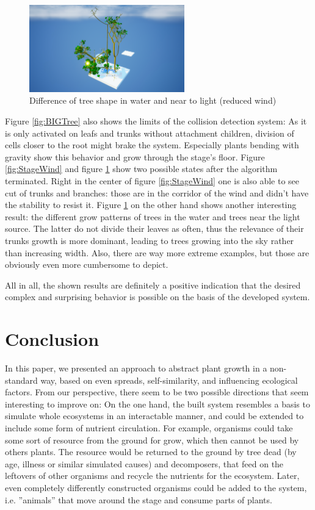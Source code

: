 \documentclass[11pt]{scrartcl}
\begin{document}
\begin{figure}
 	 \centering
 	    \includegraphics[width=0.6\textwidth]{SS_StageTallTrees.png}
 	 \caption{Difference of tree shape in water and near to light (reduced wind)}
 	 \label{fig:StageTallTrees}
\end{figure}

Figure \ref{fig:BIGTree} also shows the limits of the collision detection system: As it is only activated on leafs and trunks without attachment children, division of cells closer to the root might brake the system. Especially plants bending with gravity show this behavior and grow through the stage's floor. Figure \ref{fig:StageWind} and figure \ref{fig:StageTallTrees} show two possible states after the algorithm terminated. Right in the center of figure \ref{fig:StageWind} one is also able to see cut of trunks and branches: those are in the corridor of the wind and didn't have the stability to resist it. Figure \ref{fig:StageTallTrees} on the other hand shows another interesting result: the different grow patterns of trees in the water and trees near the light source. The latter do not divide their leaves as often, thus the relevance of their trunks growth is more dominant, leading to trees growing into the sky rather than increasing width. Also, there are way more extreme examples, but those are obviously even more cumbersome to depict.

All in all, the shown results are definitely a positive indication that the desired complex and surprising behavior is possible on the basis of the developed system.

\section{Conclusion}
In this paper, we presented an approach to abstract plant growth in a non-standard way, based on even spreads, self-similarity, and influencing ecological factors. From our perspective, there seem to be two possible directions that seem interesting to improve on: On the one hand, the built system resembles a basis to simulate whole ecosystems in an interactable manner, and could be extended to include some form of nutrient circulation. For example, organisms could take some sort of resource from the ground for grow, which then cannot be used by others plants. The resource would be returned to the ground by tree dead (by age, illness or similar simulated causes) and decomposers, that feed on the leftovers of other organisms and recycle the nutrients for the ecosystem. Later, even completely differently constructed organisms could be added to the system, i.e. ''animals'' that move around the stage and consume parts of plants.
\end{document}
